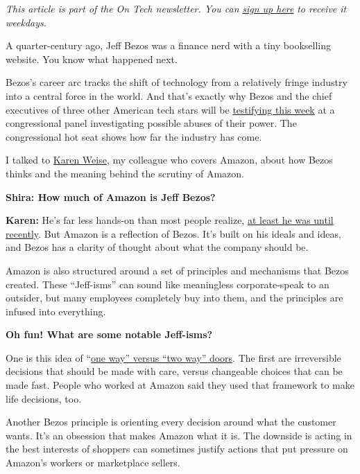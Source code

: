 \emph{This article is part of the On Tech newsletter. You can}
\href{https://www.nytimes3xbfgragh.onion/newsletters/signup/OT}{\emph{sign
up here}} \emph{to receive it weekdays.}

A quarter-century ago, Jeff Bezos was a finance nerd with a tiny
bookselling website. You know what happened next.

Bezos's career arc tracks the shift of technology from a relatively
fringe industry into a central force in the world. And that's exactly
why Bezos and the chief executives of three other American tech stars
will be
\href{https://www.nytimes3xbfgragh.onion/2020/07/28/technology/amazon-apple-facebook-google-antitrust-hearing.html}{testifying
this week} at a congressional panel investigating possible abuses of
their power. The congressional hot seat shows how far the industry has
come.

I talked to
\href{https://www.nytimes3xbfgragh.onion/by/karen-weise}{Karen Weise},
my colleague who covers Amazon, about how Bezos thinks and the meaning
behind the scrutiny of Amazon.

\textbf{Shira: How much of Amazon is Jeff Bezos?}

\textbf{Karen:} He's far less hands-on than most people realize,
\href{https://www.nytimes3xbfgragh.onion/2020/04/22/technology/bezos-amazon-coronavirus.html}{at
least he was until recently}. But Amazon is a reflection of Bezos. It's
built on his ideals and ideas, and Bezos has a clarity of thought about
what the company should be.

Amazon is also structured around a set of principles and mechanisms that
Bezos created. These ``Jeff-isms'' can sound like meaningless
corporate-speak to an outsider, but many employees completely buy into
them, and the principles are infused into everything.

\textbf{Oh fun! What are some notable Jeff-isms?}

One is this idea of
``\href{https://www.inc.com/jeff-haden/amazon-founder-jeff-bezos-this-is-how-successful-people-make-such-smart-decisions.html}{one
way'' versus ``two way'' doors}. The first are irreversible decisions
that should be made with care, versus changeable choices that can be
made fast. People who worked at Amazon said they used that framework to
make life decisions, too.

Another Bezos principle is orienting every decision around what the
customer wants. It's an obsession that makes Amazon what it is. The
downside is acting in the best interests of shoppers can sometimes
justify actions that put pressure on Amazon's workers or marketplace
sellers.

